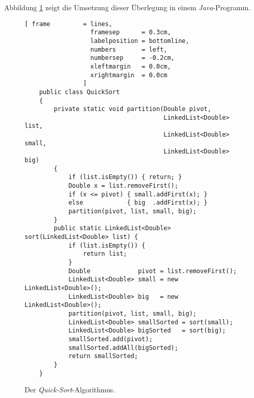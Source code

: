 Abbildung \ref{fig:quick-sort} zeigt die Umsetzung dieser \"Uberlegung 
in einem \textsl{Java}-Programm.

\begin{figure}[!ht]
  \centering
\begin{Verbatim}[ frame         = lines, 
                  framesep      = 0.3cm, 
                  labelposition = bottomline,
                  numbers       = left,
                  numbersep     = -0.2cm,
                  xleftmargin   = 0.0cm,
                  xrightmargin  = 0.0cm
                ]
    public class QuickSort
    {  
        private static void partition(Double pivot, 
                                      LinkedList<Double> list,
                                      LinkedList<Double> small, 
                                      LinkedList<Double> big) 
        {
            if (list.isEmpty()) { return; }
            Double x = list.removeFirst();
            if (x <= pivot) { small.addFirst(x); } 
            else            { big  .addFirst(x); }
            partition(pivot, list, small, big);
        }
        public static LinkedList<Double> sort(LinkedList<Double> list) {
            if (list.isEmpty()) {
                return list;
            }
            Double             pivot = list.removeFirst();
            LinkedList<Double> small = new LinkedList<Double>();
            LinkedList<Double> big   = new LinkedList<Double>();
            partition(pivot, list, small, big);
            LinkedList<Double> smallSorted = sort(small);
            LinkedList<Double> bigSorted   = sort(big);
            smallSorted.add(pivot);
            smallSorted.addAll(bigSorted);
            return smallSorted;
        }    
    }
\end{Verbatim}
\vspace*{-0.3cm}
  \caption{Der \emph{Quick-Sort}-Algorithmus.}
  \label{fig:quick-sort}
\end{figure}

